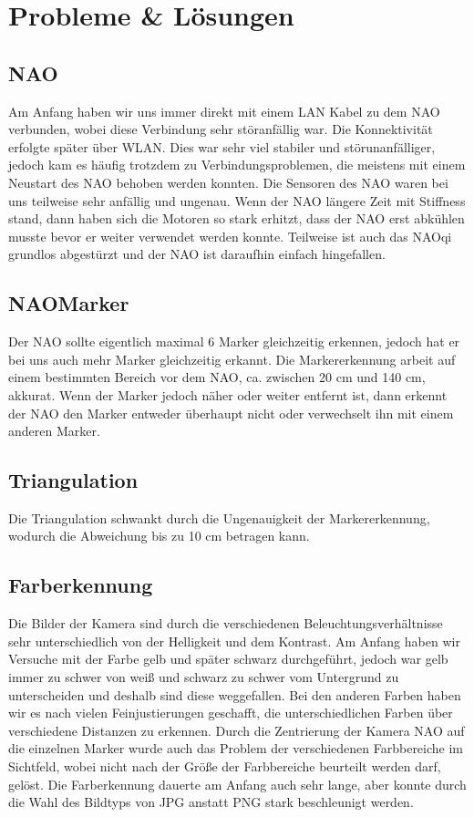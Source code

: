 \section{Probleme \& Lösungen}

\subsection{NAO}
Am Anfang haben wir uns immer direkt mit einem LAN Kabel zu dem NAO verbunden, wobei diese Verbindung sehr störanfällig war. 
Die Konnektivität erfolgte später über WLAN. Dies war sehr viel stabiler und störunanfälliger, jedoch kam es häufig trotzdem zu Verbindungsproblemen, die meistens mit einem Neustart des NAO behoben werden konnten.
Die Sensoren des NAO waren bei uns teilweise sehr anfällig und ungenau.
Wenn der NAO längere Zeit mit Stiffness stand, dann haben sich die Motoren so stark erhitzt, dass der NAO erst abkühlen musste bevor er weiter verwendet werden konnte.
Teilweise ist auch das NAOqi grundlos abgestürzt und der NAO ist daraufhin einfach hingefallen.

\subsection{NAOMarker}
Der NAO sollte eigentlich maximal 6 Marker gleichzeitig erkennen, jedoch hat er bei uns auch mehr Marker gleichzeitig erkannt. Die Markererkennung arbeit auf einem bestimmten Bereich vor dem NAO, ca. zwischen 20 cm und 140 cm, akkurat. Wenn der Marker jedoch näher oder weiter entfernt ist, dann erkennt der NAO den Marker entweder überhaupt nicht oder verwechselt ihn mit einem anderen Marker.

\subsection{Triangulation}
Die Triangulation schwankt durch die Ungenauigkeit der Markererkennung, wodurch die Abweichung bis zu 10 cm betragen kann.

\subsection{Farberkennung}
Die Bilder der Kamera sind durch die verschiedenen Beleuchtungsverhältnisse sehr unterschiedlich von der Helligkeit und dem Kontrast. Am Anfang haben wir Versuche mit der Farbe gelb und später schwarz durchgeführt, jedoch war gelb immer zu schwer von weiß und schwarz zu schwer vom Untergrund zu unterscheiden und deshalb sind diese weggefallen. Bei den anderen Farben haben wir es nach vielen Feinjustierungen geschafft, die unterschiedlichen Farben über verschiedene Distanzen zu erkennen.
Durch die Zentrierung der Kamera NAO auf die einzelnen Marker wurde auch das Problem der verschiedenen Farbbereiche im Sichtfeld, wobei nicht nach der Größe der Farbbereiche beurteilt werden darf, gelöst.
Die Farberkennung dauerte am Anfang auch sehr lange, aber konnte durch die Wahl des Bildtyps von JPG anstatt PNG stark beschleunigt werden.\\